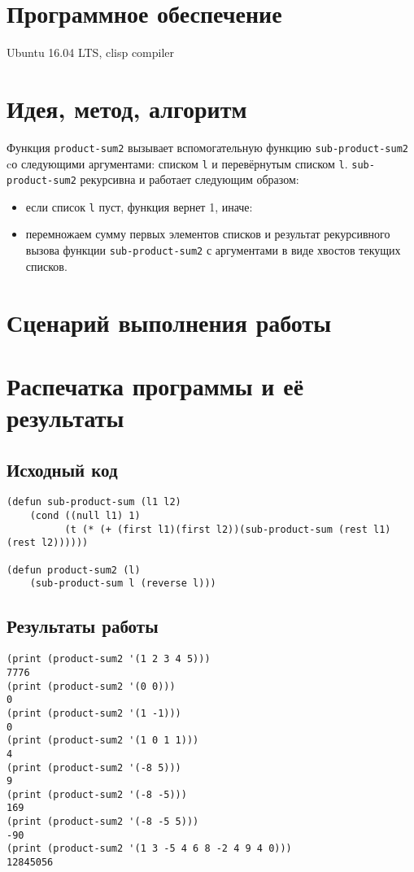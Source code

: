 \documentclass[12pt]{article}
\begin{document}
\section{Программное обеспечение}
Ubuntu 16.04 LTS, clisp compiler

\section{Идея, метод, алгоритм}
Функция {\tt product-sum2} вызывает вспомогательную функцию {\tt sub-product-sum2} cо следующими аргументами: списком {\tt l} и перевёрнутым списком {\tt l}. {\tt sub-product-sum2} рекурсивна и работает следующим образом:
\begin{itemize}
\setlength{\itemsep}{-1mm} %
\item если список {\tt l} пуст, функция вернет 1, иначе:
\item перемножаем сумму первых элементов списков и результат рекурсивного вызова функции {\tt sub-product-sum2} с аргументами в виде хвостов текущих списков.
\end{itemize}

\section{Сценарий выполнения работы}

\section{Распечатка программы и её результаты}

\subsection{Исходный код}

\begin{lstlisting}
(defun sub-product-sum (l1 l2)
    (cond ((null l1) 1)
          (t (* (+ (first l1)(first l2))(sub-product-sum (rest l1)(rest l2))))))

(defun product-sum2 (l)
    (sub-product-sum l (reverse l)))
\end{lstlisting}

\subsection{Результаты работы}
\begin{lstlisting}
(print (product-sum2 '(1 2 3 4 5)))
7776
(print (product-sum2 '(0 0)))
0
(print (product-sum2 '(1 -1)))
0
(print (product-sum2 '(1 0 1 1)))
4
(print (product-sum2 '(-8 5)))
9
(print (product-sum2 '(-8 -5)))
169
(print (product-sum2 '(-8 -5 5)))
-90
(print (product-sum2 '(1 3 -5 4 6 8 -2 4 9 4 0)))
12845056 
\end{lstlisting}
\end{document}
